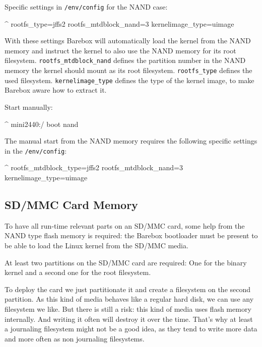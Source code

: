 Specific settings in \texttt{/env/config} for the NAND case:

\begin{ptxshell}[escapechar=|]{^}
rootfs_type=jffs2
rootfs_mtdblock_nand=3
kernelimage_type=uimage
\end{ptxshell}

With these settings Barebox will automatically load the kernel from the NAND
memory and instruct the kernel to also use the NAND memory for its root
filesystem. \texttt{rootfs\_mtdblock\_nand} defines the partition number in the
NAND memory the kernel should mount as its root filesystem. \texttt{rootfs\_type}
defines the used filesystem. \texttt{kernelimage\_type} defines the type of the
kernel image, to make Barebox aware how to extract it.

Start manually:

\begin{ptxshell}[escapechar=|]{^}
mini2440:/ boot nand
\end{ptxshell}

The manual start from the NAND memory requires the following specific settings
in the \texttt{/env/config}:

\begin{ptxshell}[escapechar=|]{^}
rootfs_mtdblock_type=jffs2
rootfs_mtdblock_nand=3
kernelimage_type=uimage
\end{ptxshell}

\subsection{SD/MMC Card Memory}

To have all run-time relevant parts on an SD/MMC card, some help from the
NAND type flash memory is required: the Barebox bootloader must be present
to be able to load the Linux kernel from the SD/MMC media.

At least two partitions on the SD/MMC card are required: One for the binary
kernel and a second one for the root filesystem.

To deploy the card we just partitionate it and create a filesystem on the second
partition. As this kind of media behaves like a regular hard disk, we can use
any filesystem we like. But there is still a risk: this kind of media uses flash
memory internally. And writing it often will destroy it over the time. That's why
at least a journaling filesystem might not be a good idea, as they tend to write
more data and more often as non journaling filesystems.

